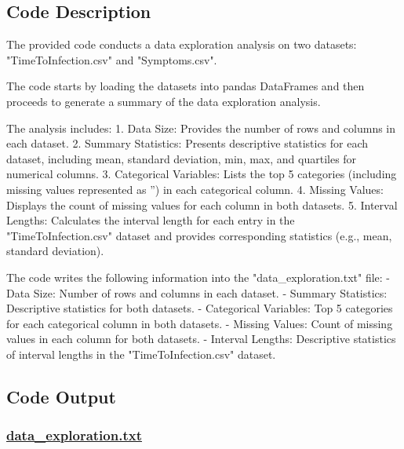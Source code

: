 \documentclass[11pt]{article}
\begin{document}
\subsection{Code Description}

The provided code conducts a data exploration analysis on two datasets: "TimeToInfection.csv" and "Symptoms.csv". 

The code starts by loading the datasets into pandas DataFrames and then proceeds to generate a summary of the data exploration analysis. 

The analysis includes:
1. Data Size: Provides the number of rows and columns in each dataset.
2. Summary Statistics: Presents descriptive statistics for each dataset, including mean, standard deviation, min, max, and quartiles for numerical columns.
3. Categorical Variables: Lists the top 5 categories (including missing values represented as '') in each categorical column.
4. Missing Values: Displays the count of missing values for each column in both datasets.
5. Interval Lengths: Calculates the interval length for each entry in the "TimeToInfection.csv" dataset and provides corresponding statistics (e.g., mean, standard deviation).

The code writes the following information into the "data\_exploration.txt" file:
- Data Size: Number of rows and columns in each dataset.
- Summary Statistics: Descriptive statistics for both datasets.
- Categorical Variables: Top 5 categories for each categorical column in both datasets.
- Missing Values: Count of missing values in each column for both datasets.
- Interval Lengths: Descriptive statistics of interval lengths in the "TimeToInfection.csv" dataset.

\subsection{Code Output}\hypertarget{file-data-exploration-txt}{}

\subsubsection*{\hyperlink{code-Data Exploration-data-exploration-txt}{data\_exploration.txt}}
\end{document}
